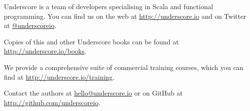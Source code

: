 \begin{center}

Underscore is a team of developers specialising in Scala and functional programming.
You can find us on the web at \href{http://underscore.io}{http://underscore.io}
and on Twitter at \href{http://twitter.com/underscoreio}{@underscoreio}.

Copies of this and other Underscore books
can be found at \href{http://underscore.io/books}{http://underscore.io/books}.

We provide a comprehensive suite of commercial training courses,
which you can find at \href{http://underscore.io/training}{http://underscore.io/training}.

Contact the authors at \href{mailto:hello@underscore.io}{hello@underscore.io}
or on GitHub at \href{http://github.com/underscoreio}{http://github.com/underscoreio}.

\end{center}
